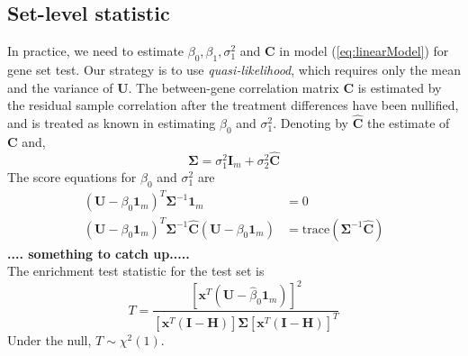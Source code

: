 \documentclass[useAMS,usenatbib, galley]{biom}
\begin{document}
	\subsection*{Set-level statistic}\label{subsection:setlevelstat}
	In practice, we need to estimate $\beta_0, \beta_1,\sigma_1^2$ and $\bm C$ in model (\ref{eq:linearModel}) for gene set test. Our strategy is to use \textit{quasi-likelihood}, which requires only the mean and the variance of $\bm U$.  The between-gene correlation matrix $\bm C$ is estimated by the residual sample correlation after the treatment differences have been nullified, and is treated as known in estimating $\beta_0$ and $\sigma_1^2$. 
	Denoting by $\hat{\bm C}$ the estimate of $\bm C$ and,
	\begin{equation}\label{eq:estimateparameter}
	\bm\Sigma = \sigma^2_1\bm I_m + \sigma_2^2 \hat{\bm C}
	\end{equation}
	The score equations for $\beta_0$ and $\sigma_1^2$ are
	\begin{equation}
	\begin{aligned}
	(\bm U - \beta_0\bm 1_m)^T \bm \Sigma^{-1}\bm 1_m & = 0\\
	(\bm U - \beta_0\bm 1_m)^T \bm \Sigma^{-1} \hat{\bm C} (\bm U - \beta_0\bm 1_m) &= \text{trace}(\bm \Sigma^{-1}\hat{\bm C})
	\end{aligned}
	\end{equation}
	\textbf{.... something to catch up.....}\\
	The enrichment test statistic for the test set is 
	\begin{equation}\label{eq:teststatistic}
	T = \frac{\left[\bm x^T(\bm U - \hat{\beta}_0 \bm 1_m )\right]^2}{\left[\bm x^T(\bm I - \bm H)\right]\bm \Sigma \left[\bm x^T(\bm I - \bm H)\right]^T}
	\end{equation} 
	Under the null, $T\sim \chi^2(1)$.
	
	
\end{document}
